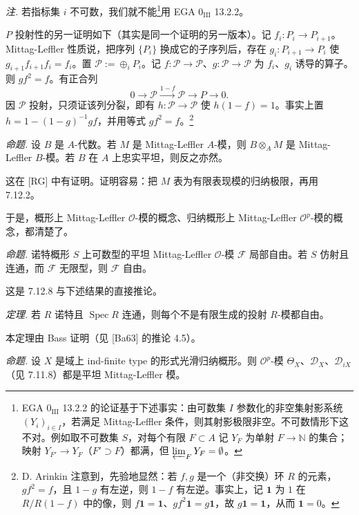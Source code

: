 \emph{注.} 若指标集 $i$ 不可数，我们就不能\footnote{EGA $0_{\mathrm{III}}$ 13.2.2 的论证基于下述事实：由可数集 $I$ 参数化的非空集射影系统 $(Y_i)_{i\in I}$，若满足 Mittag-Leffler 条件，则其射影极限非空。不可数情形下这不对。例如取不可数集 $S$，对每个有限 $F\subset A$ 记 $Y_F$ 为单射 $F\to\mathbb{N}$ 的集合；映射 $Y_{F'}\to Y_F$（$F'\supset F$）都满，但 $\varprojlim_F Y_F=\emptyset$。}用 EGA $0_{\mathrm{III}}$ 13.2.2。


$P$ 投射性的另一证明如下（其实是同一个证明的另一版本）。记 $f_i:P_i\to P_{i+1}$。Mittag-Leffler 性质说，把序列 $\{P_i\}$ 换成它的子序列后，存在 $g_i:P_{i+1}\to P_i$ 使 $g_{i+1}f_{i+1}f_i=f_i$。置 $\mathcal{P}:=\oplus_i P_i$。记 $f:\mathcal{P}\to\mathcal{P}$、$g:\mathcal{P}\to\mathcal{P}$ 为 $f_i$、$g_i$ 诱导的算子。则 $gf^2=f$。有正合列
\[
0\to\mathcal{P}\xrightarrow{1-f}\mathcal{P}\to P\to 0.
\]
因 $\mathcal{P}$ 投射，只须证该列分裂，即有 $h:\mathcal{P}\to\mathcal{P}$ 使 $h(1-f)=1$。事实上置 $h=1-(1-g)^{-1}gf$，并用等式 $gf^2=f$。\footnote{D. Arinkin 注意到，先验地显然：若 $f,g$ 是一个（非交换）环 $R$ 的元素，$gf^2=f$，且 $1-g$ 有左逆，则 $1-f$ 有左逆。事实上，记 $\mathbf{1}$ 为 $1$ 在 $R/R(1-f)$ 中的像，则 $f\mathbf{1}=\mathbf{1}$、$gf^2\mathbf{1}=g\mathbf{1}$，故 $g\mathbf{1}=\mathbf{1}$，从而 $\mathbf{1}=0$。}

 \emph{命题.} 设 $B$ 是 $A$-代数。若 $M$ 是 Mittag-Leffler $A$-模，则 $B\otimes_A M$ 是 Mittag-Leffler $B$-模。若 $B$ 在 $A$ 上忠实平坦，则反之亦然。

这在 [RG] 中有证明。证明容易：把 $M$ 表为有限表现模的归纳极限，再用 7.12.2。

于是，概形上 Mittag-Leffler $\mathcal{O}$-模的概念、归纳概形上 Mittag-Leffler $\mathcal{O}^p$-模的概念，都清楚了。

 \emph{命题.} 诺特概形 $S$ 上可数型的平坦 Mittag-Leffler $\mathcal{O}$-模 $\mathcal{F}$ 局部自由。若 $S$ 仿射且连通，而 $\mathcal{F}$ 无限型，则 $\mathcal{F}$ 自由。

这是 7.12.8 与下述结果的直接推论。

 \emph{定理.} 若 $R$ 诺特且 $\operatorname{Spec}R$ 连通，则每个不是有限生成的投射 $R$-模都自由。

本定理由 Bass 证明（见 [Ba63] 的推论 4.5）。


 \emph{命题.} 设 $X$ 是域上 ind-finite type 的形式光滑归纳概形。则 $\mathcal{O}^p$-模 $\Theta_X$、$\mathcal{D}_X$、$\mathcal{D}_{iX}$（见 7.11.8）都是平坦 Mittag-Leffler 模。

